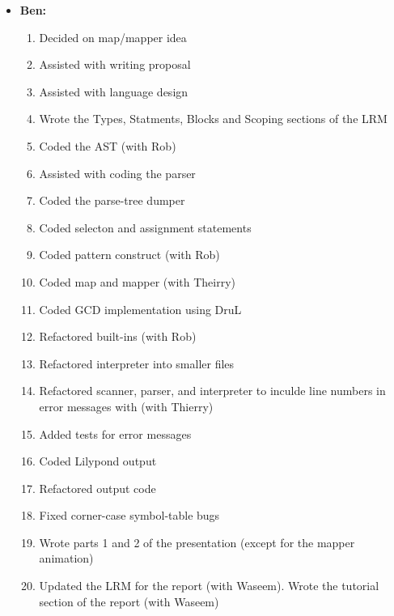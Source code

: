 \begin{itemize}
\item \textbf{Ben:}
\begin{enumerate}
	\item Decided on map/mapper idea
	\item Assisted with writing proposal
	\item Assisted with language design
	\item Wrote the Types, Statments, Blocks and Scoping sections of the LRM
	\item Coded the AST (with Rob)
	\item Assisted with coding the parser
	\item Coded the parse-tree dumper
	\item Coded selecton and assignment statements
	\item Coded pattern construct (with Rob)
	\item Coded map and mapper (with Theirry)
	\item Coded GCD implementation using DruL
	\item Refactored built-ins (with Rob)
	\item Refactored interpreter into smaller files
	\item Refactored scanner, parser, and interpreter to inculde line numbers in error messages with (with Thierry)
	\item Added tests for error messages
	\item Coded Lilypond output
	\item Refactored output code
	\item Fixed corner-case symbol-table bugs
	\item Wrote parts 1 and 2 of the presentation (except for the mapper animation)
	\item Updated the LRM for the report (with Waseem).  Wrote the tutorial section of the report (with Waseem)
\end{enumerate}


\end{itemize}
